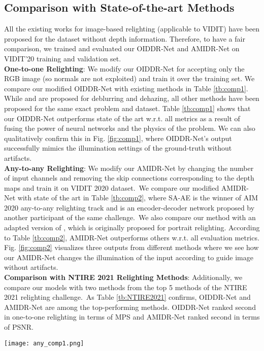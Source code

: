 \documentclass[final]{cvpr}
\newcommand{\squeezeup}{\vspace{-5mm}}
\newcommand{\smallsqueezeup}{\vspace{-2mm}}
\begin{document}
\subsection{Comparison with State-of-the-art Methods}
All the existing works for image-based relighting (applicable to VIDIT) have been proposed for the dataset without depth information. Therefore, to have a fair comparison, we trained and evaluated our OIDDR-Net and AMIDR-Net on VIDIT'20 training and validation set.\\
\textbf{One-to-one Relighting}:
We modify our OIDDR-Net for accepting only the RGB image (so normals are not exploited) and train it over the training set. We compare our modified OIDDR-Net with existing methods in Table \ref{tb:comp1}. While \cite{53} and \cite{54} are proposed for deblurring and dehazing, all other methods have been proposed for the same exact problem and dataset. Table \ref{tb:comp1} shows that our OIDDR-Net outperforms state of the art w.r.t. all metrics as a result of fusing the power of neural networks and the physics of the problem. We can also qualitatively confirm this in Fig. \ref{fig:comp1}, where OIDDR-Net's output successfully mimics the illumination settings of the ground-truth without artifacts.\\
\textbf{Any-to-any Relighting}: We modify our AMIDR-Net by changing the number of input channels and removing the skip connections corresponding to the depth maps and train it on VIDIT 2020 dataset.\ We compare our modified AMIDR-Net with state of the art in Table \ref{tb:comp2}, where SA-AE \cite{10} is the winner of AIM 2020 any-to-any relighting track and \cite{56} is an encoder-decoder network proposed by another participant of the same challenge.\ We also compare our method with an adapted version of \cite{15}, which is originally proposed for portrait relighting. According to Table \ref{tb:comp2}, AMIDR-Net outperforms others w.r.t. all evaluation metrics. Fig. \ref{fig:comp2} visualizes three outputs from different methods where we see how our AMIDR-Net changes the illumination of the input according to guide image without artifacts.\\
\textbf{Comparison with NTIRE 2021 Relighting Methods}: Additionally, we compare our models with two methods from the top 5 methods of the NTIRE 2021 relighting challenge.\ As Table \ref{tb:NTIRE2021} confirms,  OIDDR-Net and AMIDR-Net are among the top-performing methods. OIDDR-Net
ranked second in one-to-one relighting in terms of MPS
and AMIDR-Net ranked second in terms of PSNR.\smallsqueezeup 
\begin{figure*}
    \centering
    \texttt{[image: any\_comp1.png]}\smallsqueezeup
    \caption{Qualitative comparison between different methods. From left to right: input image, guide image, ground-truth, SA-AE \cite{10}, DPR \cite{15}, and AMIDR-Net (ours).}
    \label{fig:comp2}\squeezeup
\end{figure*}
\end{document}
